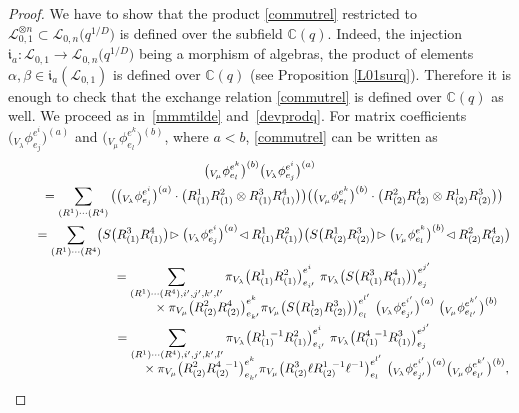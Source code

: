 \documentclass[pdftex]{sigma}%
\numberwithin{equation}{section}
\numberwithin{figure}{section}
\newcommand{\mc}{\mathbb{C}}
\newcommand{\Ll}{{\mathcal L}}
\newcommand{\ra}{\rightarrow}
\begin{document}
 \begin{proof} We have to show that the product \eqref{commutrel} restricted to $\Ll_{0,1}^{\otimes n}\subset \Ll_{0,n}\big(q^{1/D}\big)$ is defined over the subfield $\mc(q)$. Indeed, the injection $\mathfrak{i}_a\colon \Ll_{0,1}\ra \Ll_{0,n}\big(q^{1/D}\big)$ being a morphism of algebras, the product of elements $\alpha, \beta\in \mathfrak{i}_a(\Ll_{0,1})$ is defined over $\mc(q)$ (see Proposition \ref{L01surq}). Therefore it is enough to check that the exchange relation \eqref{commutrel} is defined over $\mc(q)$ as well. We proceed as in~\eqref{mmmtilde} and~\eqref{devprodq}. For matrix coefficients $\big({}_{V_\lambda}\phi^{e^i}_{e_j}\big)^{(a)}$ and $\big({}_{V_\mu}\phi^{e^k}_{e_l}\big)^{(b)}$, where $a<b$, \eqref{commutrel} can be written as
 \begin{gather*}%
\big({}_{V_\mu}\phi^{e^k}_{e_l}\big)^{(b)} \big({}_{V_\lambda}\phi^{e^i}_{e_j}\big)^{(a)}
\\ \qquad
{}= \sum_{(R^1)\cdots (R^4)} \big(\big({}_{V_\lambda}\phi^{e^i}_{e_j}\big)^{(a)}\cdot \big(R^1_{(1)}R^2_{(1)} \otimes R^3_{(1)}R^4_{(1)}\big) \big)\big(\big({}_{V_\mu}\phi^{e^k}_{e_l}\big)^{(b)}\cdot \big(R^2_{(2)}R^4_{(2)} \otimes R^1_{(2)}R^3_{(2)}\big)\big)
\\ \qquad
{}= \sum_{(R^1)\cdots (R^4)}\!\!\! \big(S\big(R^3_{(1)}R^4_{(1)}\big)\!\rhd \big({}_{V_\lambda}\phi^{e^i}_{e_j}\big)^{(a)}\! \lhd R^1_{(1)}R^2_{(1)}\big)\big(S\big(R^1_{(2)}R^3_{(2)}\big)\!\rhd \big({}_{V_\mu}\phi^{e^k}_{e_l}\big)^{(b)}\!\lhd R^2_{(2)}R^4_{(2)}\big)
\\ \qquad
{} = \sum_{(R^1)\cdots (R^4), i',j',k',l'} \pi_{V_\lambda}\big(R^1_{(1)}R^2_{(1)}\big)^{e^i}_{e_{i'}} \ \pi_{V_\lambda}\big(S\big(R^3_{(1)}R^4_{(1)}\big)\big)^{e^{j'}}_{e_{j}}
 \\[-2ex] \qquad\hphantom{= \sum_{(R^1)\cdots (R^4), i',j',k',l'}}
{}\times \pi_{V_\mu}\big(R^2_{(2)}R^4_{(2)}\big)^{e^k}_{e_{k'}} \pi_{V_\mu}\big(S\big(R^1_{(2)}R^3_{(2)}\big)\big)^{e^{l'}}_{e_{l}}\ \big({}_{V_\lambda}\phi^{e^{i'}}_{e_{j'}}\big)^{(a)} \ \big({}_{V_\mu}\phi^{e^{k'}}_{e_{l'}}\big)^{(b)}
\\ \qquad
{} = \sum_{(R^1)\cdots (R^4), i',j',k',l'} \pi_{V_\lambda}\big(R^1_{(1)}\!\!{}^{-1}R^2_{(1)}\big)^{e^i}_{e_{i'}} \ \pi_{V_\lambda}\big(R^4_{(1)}\!\!{}^{-1} R^3_{(1)}\big)^{e^{j'}}_{e_{j}}
 \\[-2ex] \qquad\hphantom{=\sum_{(R^1)\cdots (R^4), i',j',k',l'}}
{}\times \pi_{V_\mu}\big(R^2_{(2)}R^4_{(2)}\!\!{}^{-1}\big)^{e^k}_{e_{k'}} \pi_{V_\mu}\big(R^3_{(2)}\ell R^1_{(2)}\!\!{}^{-1} \ell^{-1}\big)^{e^{l'}}_{e_{l}}\ \big({}_{V_\lambda}\phi^{e^{i'}}_{e_{j'}}\big)^{(a)} \big({}_{V_\mu}\phi^{e^{k'}}_{e_{l'}}\big)^{(b)},

\end{gather*}
\end{proof}
\end{document}
